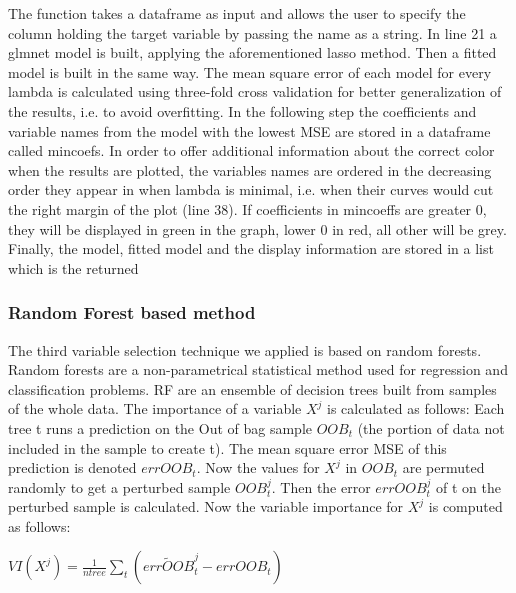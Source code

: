 \documentclass[12pt,a4paper,english]{article}
\begin{document}
The function takes a dataframe as input and allows the user to specify the column holding the target variable by passing the name as a string.
In line 21 a glmnet model is built, applying the aforementioned lasso method.
Then a fitted model is built in the same way. The mean square error of each model for every lambda is calculated using three-fold cross validation for better generalization of the results, i.e. to avoid overfitting.
In the following step the coefficients and variable names from the model with the lowest MSE are stored in a dataframe called mincoefs. In order to offer additional information about the correct color when the results are plotted, the variables names are ordered in the decreasing order they appear in when lambda is minimal, i.e. when their curves would cut the right margin of the plot (line 38). If coefficients in mincoeffs are greater 0, they will be displayed in green in the graph, lower 0 in red, all other will be grey.
Finally, the model, fitted model and the display information are stored in a list which is the returned



\subsubsection{Random Forest based method}

The third variable selection technique we applied is based on random forests.
Random forests are a non-parametrical statistical method used for regression and classification problems. RF are an ensemble of decision trees built from samples of the whole data. The importance of a variable $X^j$ is calculated as follows: Each tree t runs a prediction on the Out of bag sample $OOB_{t}$ (the portion of data not included in the sample to create t). The mean square error MSE of this prediction is denoted $errOOB_{t}$. Now the values for $X^j$ in $OOB_{t}$ are permuted randomly to get a perturbed sample ${OOB}^j_{t}$. Then the error ${errOOB}^j_{t}$ of t on the perturbed sample is calculated. Now the variable importance for $X^j$ is computed as follows:\\
\begin{center} $VI(X^j)=\frac{1}{ntree}\sum_{t}\left ( \widetilde{errOOB}^j_{t} - errOOB_{t} \right )$ \end{center}
\end{document}
